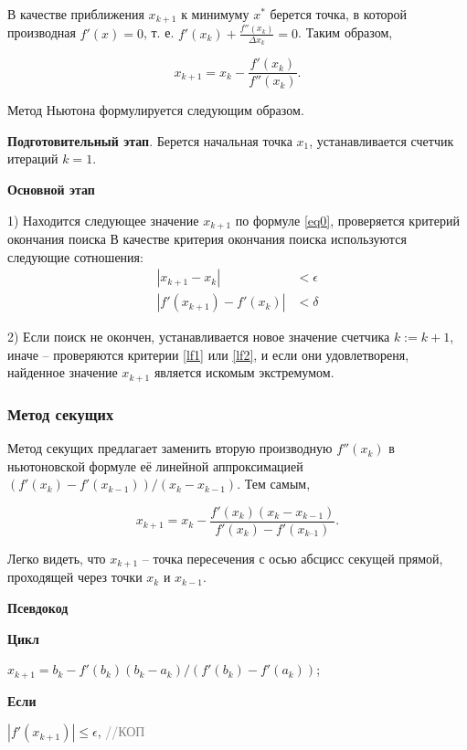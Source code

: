 \documentclass[a4paper,12pt]{article}
\begin{document}
В качестве приближения $x_{k + 1}$ к минимуму $x^*$ берется точка, в которой производная 
$f'(x) = 0$, т. е. 
$f'(x_k) + \frac{f''(x_k)}{\Delta x_k} = 0$.
Таким образом, 

\begin{equation}
x_{k + 1} = x_k-\frac{f'(x_k)}{f ''(x_k)}.
\label{eq0}
\end{equation}

Метод Ньютона формулируется следующим образом.

\textbf{Подготовительный этап}. Берется начальная точка $x_1$, устанавливается счетчик итераций $k=1$.

\textbf{Основной этап}

1) Находится следующее значение $x_{k+1}$ по формуле \eqref{eq0}, проверяется критерий окончания поиска
В качестве критерия окончания поиска используются следующие сотношения:
\begin{align*}
|x_{k + 1}-x_k| &< \epsilon
\\
|f'(x_{k + 1})-f'(x_k)| &< \delta
\end{align*}

2) Если поиск не окончен, устанавливается новое значение счетчика $k := k + 1$, иначе -- проверяются критерии \eqref{lf1} или \eqref{lf2}, и если они удовлетвореня, найденное значение $x_{k+1}$ является искомым экстремумом.

\subsubsection*{Метод секущих}

Метод секущих предлагает заменить вторую производную 
$f''(x_k)$ в ньютоновской формуле её линейной аппроксимацией $(f'(x_k) - f'(x_{k - 1}))/(x_{k} - x_{k - 1})$. Тем самым,

\begin{equation*}
x_{k + 1} = x_k - \frac{f'(x_k)(x_k - x_{k - 1})}{f'(x_k) - f '(x_{k – 1})}.
\end{equation*}

Легко видеть, что $x_{k + 1}$ -- точка пересечения с осью абсцисс секущей прямой, проходящей через точки $x_{k}$ и $x_{k - 1}$.

\textbf{Псевдокод}

\textbf{Цикл} 

$x_{k + 1} = b_{k} - f'(b_k)(b_k - a_k)/(f'(b_k) - f'(a_k))$; 

\textbf{Если}

\quad $|f'(x_{k + 1})| \leq \epsilon$, \textcolor{gray}{//КОП}
\end{document}

